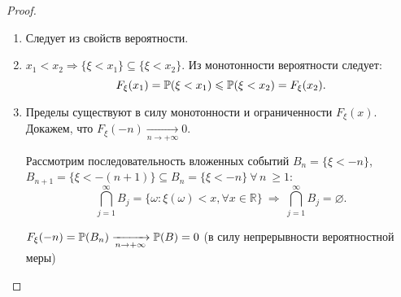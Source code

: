 \begin{proof}
\begin{enumerate}
    \item 
        Следует из свойств вероятности.
    \item 
        $x_1 < x_2 \Rightarrow \{\xi < x_1 \} \subseteq \{\xi < x_2\}$. 
        Из монотонности вероятности следует:
        \begin{equation*}
            F_\xi(x_1) = {\mathbb{P}(\xi < x_1)} \leqslant {\mathbb{P}(\xi < x_2)} = F_\xi(x_2).
        \end{equation*}
    \item 
        Пределы существуют в силу монотонности и ограниченности $F_\xi(x)$. 
        Докажем, что $F_\xi(-n) \xrightarrow[n \to +\infty]{} 0$.
        
        Рассмотрим последовательность вложенных событий 
        $B_n = \{\xi < -n \}$, 
        $B_{n+1} = \{\xi < -(n+1) \} \subseteq B_n = \{\xi < -n \} ~ \forall \, n ~ \geqslant 1$:
        \begin{equation*}
            \bigcap\limits_{j = 1}^{\infty}B_j = \{\omega \colon \xi(\omega) < x, \forall x \in \mathbb{R} \} \: \Rightarrow \: \bigcap\limits_{j = 1}^{\infty}B_j = \varnothing.
        \end{equation*}
    
        $F_\xi(-n) = {\mathbb{P}(B_n)} \xrightarrow[n \to +\infty]{} {\mathbb{P}(B)} = 0$ (в силу непрерывности вероятностной меры)
    

\end{enumerate}
\end{proof}
